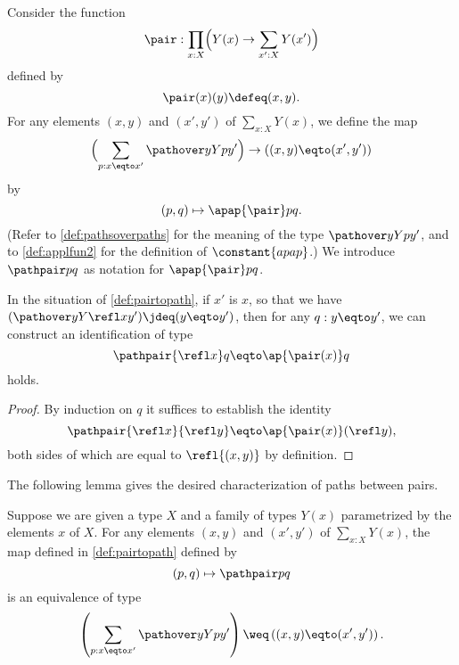 \begin{definition}
{}
  Consider the function
  \[
    \pair : \prod_{x:X} \Bigl( Y(x) \to \sum _{x':X} Y(x') \Bigr)
  \]
  defined by
  \[
    \pair(x)(y) \defeq (x,y).
  \]
  For any elements $(x,y)$ and $(x',y')$ of $\sum _{x:X} Y(x)$, we define the map
  \[
    \Bigl( \sum_{p:x \eqto x'} \pathover y Y p {y'} \Bigr)
    \to \left ( (x,y) \eqto (x',y') \right )
  \]
  by
  \[
    (p,q) \mapsto \apap {\pair} p q.
  \]
  (Refer to \cref{def:pathsoverpaths} for the meaning of the type $\pathover y Y p {y'}$, and to \cref{def:applfun2} for the definition of $\constant{apap}$.)
  We introduce $\pathpair p q$ as notation for $\apap {\pair} p q$.
\end{definition}

\begin{lemma}\label{cor:isEq-pair=}
  In the situation of \cref{def:pairtopath}, if $x'$ is $x$,
  so that we have $( \pathover y Y {\refl x} {y'} ) \jdeq ( y \eqto y' )$,
  then for any $q : y \eqto y'$, we can construct an identification of type
  \[
    \pathpair {\refl x} q \eqto \ap {\pair (x)} q
  \]
  holds.
\end{lemma}

\begin{proof}
  By induction on $q$ it suffices to establish the identity
  \[
    \pathpair {\refl x} {\refl y} \eqto \ap {\pair (x)} (\refl y),
  \]
  both sides of which are
  equal to $\refl {(x,y)}$ by definition.
\end{proof}

The following lemma gives the desired characterization of paths between pairs.

\begin{lemma}\label{lem:isEq-pair=}
  Suppose we are given a type $X$ and a family of types $Y(x)$ parametrized by the elements $x$ of $X$.
  For any elements $(x,y)$ and $(x',y')$ of $\sum _{x:X} Y(x)$,
  the map defined in \cref{def:pairtopath} defined by
  \[
    (p,q) \mapsto \pathpair p q
  \]
  is an equivalence of type
  \[
    \left( \sum_{p:x \eqto x'} \pathover y Y p {y'} \right)
    \weq \left ( (x,y) \eqto (x',y') \right ).
  \]
\end{lemma}

